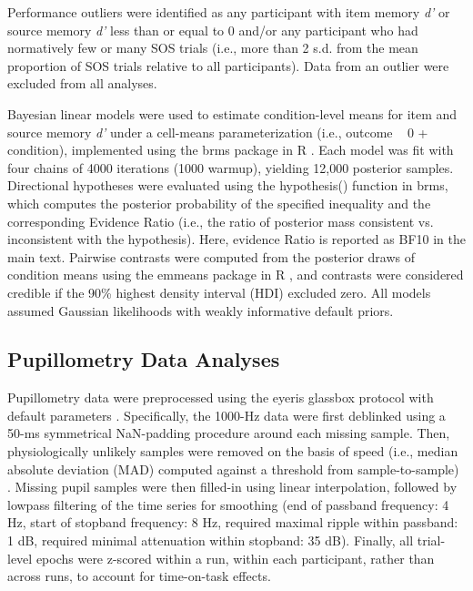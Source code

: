 Performance outliers were identified as any participant with item memory \textit{d'} or source memory \textit{d'} less than or equal to 0 and/or any participant who had normatively few or many SOS trials (i.e., more than 2 s.d. from the mean proportion of SOS trials relative to all participants). Data from an outlier were excluded from all analyses.

Bayesian linear models were used to estimate condition-level means for item and source memory \textit{d'} under a cell-means parameterization (i.e., outcome ~ 0 + condition), implemented using the brms package in R \parencite{burkner2017brms}. Each model was fit with four chains of 4000 iterations (1000 warmup), yielding 12,000 posterior samples. Directional hypotheses were evaluated using the hypothesis() function in brms, which computes the posterior probability of the specified inequality and the corresponding Evidence Ratio (i.e., the ratio of posterior mass consistent vs. inconsistent with the hypothesis). Here, evidence Ratio is reported as BF10 in the main text. Pairwise contrasts were computed from the posterior draws of condition means using the emmeans package in R \parencite{lenth2019emmeans}, and contrasts were considered credible if the 90\% highest density interval (HDI) excluded zero. All models assumed Gaussian likelihoods with weakly informative default priors.

\subsection{Pupillometry Data Analyses}

Pupillometry data were preprocessed using the eyeris glassbox protocol with default parameters \parencite{schwartz2025eyeris,schwartz2025eyerispaper}. Specifically, the 1000-Hz data were first deblinked using a 50-ms symmetrical NaN-padding procedure around each missing sample. Then, physiologically unlikely samples were removed on the basis of speed (i.e., median absolute deviation (MAD) computed against a threshold from sample-to-sample) \parencite{leys2013detecting}. Missing pupil samples were then filled-in using linear interpolation, followed by lowpass filtering of the time series for smoothing (end of passband frequency: 4 Hz, start of stopband frequency: 8 Hz, required maximal ripple within passband: 1 dB, required minimal attenuation within stopband: 35 dB). Finally, all trial-level epochs were z-scored within a run, within each participant, rather than across runs, to account for time-on-task effects.

